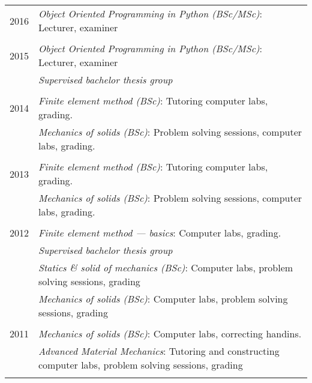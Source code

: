 \documentclass[a4paper,10pt]{article} %
\begin{document}
{\begin{tabular}{r|p{11cm}}
\textsc{2016} 
              & \emph{Object Oriented Programming in Python (BSc/MSc)}: \footnotesize{Lecturer, examiner}\\
\multicolumn{2}{c}{} \\

\textsc{2015} 
	      & \emph{Object Oriented Programming in Python (BSc/MSc)}: \footnotesize{Lecturer, examiner}\\
              & \emph{Supervised bachelor thesis group}\\
\multicolumn{2}{c}{} \\

\textsc{2014} 
              & \emph{Finite element method (BSc)}: \footnotesize{Tutoring computer labs, grading.}\\
              & \emph{Mechanics of solids (BSc)}: \footnotesize{Problem solving sessions, computer labs, grading.}\\
\multicolumn{2}{c}{} \\

\textsc{2013} 
              & \emph{Finite element method (BSc)}: \footnotesize{Tutoring computer labs, grading.}\\
              & \emph{Mechanics of solids (BSc)}: \footnotesize{Problem solving sessions, computer labs, grading.}\\
\multicolumn{2}{c}{} \\


\textsc{2012} 
              & \emph{Finite element method --- basics}: \footnotesize{Computer labs, grading.}\\
              & \emph{Supervised bachelor thesis group}\\
              & \emph{Statics \& solid of mechanics (BSc)}: \footnotesize{Computer labs, problem solving sessions, grading}\\
              & \emph{Mechanics of solids (BSc)}: \footnotesize{Computer labs, problem solving sessions, grading}\\
\multicolumn{2}{c}{} \\


\textsc{2011} 
              & \emph{Mechanics of solids (BSc)}: \footnotesize{Computer labs, correcting handins.}\\
              & \emph{Advanced Material Mechanics}: \footnotesize{Tutoring and constructing computer labs, problem solving sessions, grading}\\
\multicolumn{2}{c}{} \\


\end{tabular}}
\end{document}
